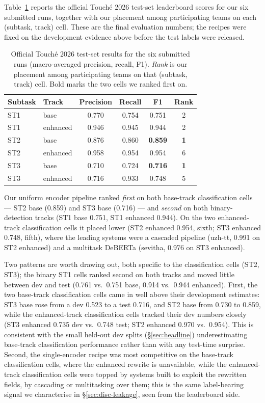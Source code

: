 Table~\ref{tab:test} reports the official Touch\'{e} 2026 test-set leaderboard scores for our six submitted runs, together with our placement among participating teams on each (subtask, track) cell. These are the final evaluation numbers; the recipes were fixed on the development evidence above before the test labels were released.

\begin{table}[h]
\centering
\small
\caption{Official Touch\'{e} 2026 test-set results for the six submitted runs
(macro-averaged precision, recall, F1). \emph{Rank} is our placement among
participating teams on that (subtask, track) cell. Bold marks the two cells we
ranked first on.}
\label{tab:test}
\begin{tabular}{llcccc}
\toprule
Subtask & Track & Precision & Recall & F1 & Rank \\
\midrule
ST1 & base     & 0.770 & 0.754 & 0.751          & 2 \\
ST1 & enhanced & 0.946 & 0.945 & 0.944          & 2 \\
ST2 & base     & 0.876 & 0.860 & \textbf{0.859} & \textbf{1} \\
ST2 & enhanced & 0.958 & 0.954 & 0.954          & 6 \\
ST3 & base     & 0.710 & 0.724 & \textbf{0.716} & \textbf{1} \\
ST3 & enhanced & 0.716 & 0.933 & 0.748          & 5 \\
\bottomrule
\end{tabular}
\end{table}

Our uniform encoder pipeline ranked \emph{first} on both base-track classification cells --- ST2 base (0.859) and ST3 base (0.716) --- and \emph{second} on both binary-detection tracks (ST1 base 0.751, ST1 enhanced 0.944). On the two enhanced-track classification cells it placed lower (ST2 enhanced 0.954, sixth; ST3 enhanced 0.748, fifth), where the leading systems were a cascaded pipeline (\textsf{uzh-tt}, 0.991 on ST2 enhanced) and a multitask DeBERTa (\textsf{sevitha}, 0.976 on ST3 enhanced).

Two patterns are worth drawing out, both specific to the classification cells (ST2, ST3); the binary ST1 cells ranked second on both tracks and moved little between dev and test (0.761 vs.\ 0.751 base, 0.914 vs.\ 0.944 enhanced). First, the two base-track classification cells came in well above their development estimates: ST3 base rose from a dev 0.523 to a test 0.716, and ST2 base from 0.730 to 0.859, while the enhanced-track classification cells tracked their dev numbers closely (ST3 enhanced 0.735 dev vs.\ 0.748 test; ST2 enhanced 0.970 vs.\ 0.954). This is consistent with the small held-out dev splits (\S\ref{sec:headline}) underestimating base-track classification performance rather than with any test-time surprise. Second, the single-encoder recipe was most competitive on the base-track classification cells, where the enhanced rewrite is unavailable, while the enhanced-track classification cells were topped by systems built to exploit the rewritten fields, by cascading or multitasking over them; this is the same label-bearing signal we characterise in \S\ref{sec:disc-leakage}, seen from the leaderboard side.

